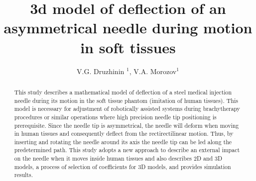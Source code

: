 \documentclass[a4paper]{jpconf}
\begin{document}
\title{3d model of deflection of an asymmetrical needle during motion in soft tissues}

\author{V.G. Druzhinin $^1$, V.A. Morozov$^1$}

\address{$^1$Department of Physical Mechanics, St. Petersburg University, 7/9 Universitetskaya Emb.,St Petersburg 199034, Russia}



\begin{abstract}
This study describes a mathematical model of deflection of a steel medical injection needle during its motion in the soft tissue phantom (imitation of human tissues). This model is necessary for adjustment of robotically assisted systems during brachytherapy procedures or similar operations where high precision needle tip positioning is prerequisite. Since the needle tip is asymmetrical, the needle will deform when moving in human tissues and consequently deflect from the rectirectilinear motion. Thus, by inserting and rotating the needle around its axis the needle tip can be led along the predetermined path. This study adopts a new approach to describe an external impact on the needle when it moves inside human tissues and also describes 2D and 3D models, a process of selection of coefficients for 3D models, and provides simulation results.
\end{abstract}
\end{document}

